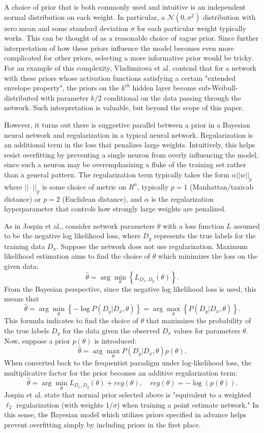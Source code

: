 \documentclass[12pt]{article}
\begin{document}
A choice of prior that is both commonly used and intuitive is an independent normal distribution on each weight. In particular, a $\mathcal{N}(0, \sigma^2)$ distribution with zero mean and some standard deviation $\sigma$ for each particular weight typically works. This can be thought of as a reasonable choice of vague prior. Since further interpretation of how these priors influence the model becomes even more complicated for other priors, selecting a more informative prior would be tricky. For an example of this complexity, Vladimirova et al. contend that for a network with these priors whose activation functions satisfying a certain "extended envelope property", the priors on the $k^{th}$ hidden layer become sub-Weibull-distributed with parameter $k/2$ conditional on the data passing through the network. Such interpretation is valuable, but beyond the scope of this paper.

However, it turns out there is suggestive parallel between a prior in a Bayesian neural network and regularization in a typical neural network. Regularization is an additional term in the loss that penalizes large weights. Intuitively, this helps resist overfitting by preventing a single neuron from overly influencing the model, since such a neuron may be overemphasizing a fluke of the training set rather than a general pattern. The regularization term typically takes the form $\alpha ||w||_p$  where $||\cdot||_p$ is some choice of metric on $R^n$, typically $p=1$ (Manhattan/taxicab distance) or $p=2$ (Euclidean distance), and $\alpha$ is the regularization hyperparameter that controls how strongly large weights are penalized. 

As in Jospin et al., consider network parameters $\theta$ with a loss function $L$ assumed to be the negative log likelihood loss, where $D_y$ represents the true labels for the training data $D_x$. Suppose the network does not use regularization. Maximum likelihood estimation aims to find the choice of $\theta$ which minimizes the loss on the given data:
$$
\hat{\theta} = \arg \min_{\theta} \left\{ L_{D_x, D_y} (\theta) \right\}.
$$
From the Bayesian perspective, since the negative log likelihood loss is used, this means that
$$
\hat{\theta} = \arg \min_{\theta} \left\{- \log P(D_y|D_x, \theta) \right\} = \arg \max_{\theta} \left\{ P(D_y|D_x, \theta) \right\}.
$$
This formula indicates to find the choice of $\theta$ that maximizes the probability of the true labels $D_y$ for the data given the observed $D_x$ values for parameters $\theta$. Now, suppose a prior $p(\theta)$ is introduced:
$$
\hat{\theta} = \arg \max_{\theta} P(D_y|D_x, \theta) p(\theta).
$$
When converted back to the frequentist paradigm under log-likelihood loss, the multiplicative factor for the prior becomes an additive regularization term:
$$
\hat{\theta} = \arg \min_{\theta} L_{D_x, D_y} (\theta) + reg(\theta), \quad reg(\theta) = -\log(p(\theta)).
$$
Jospin et al. state that normal prior selected above is "equivalent to a weighted $\ell_2$ regularization (with weights $1/\sigma$) when training a point estimate network." In this sense, the Bayesian model which utilizes priors specified in advance helps prevent overfitting simply by including priors in the first place. 
\end{document}
